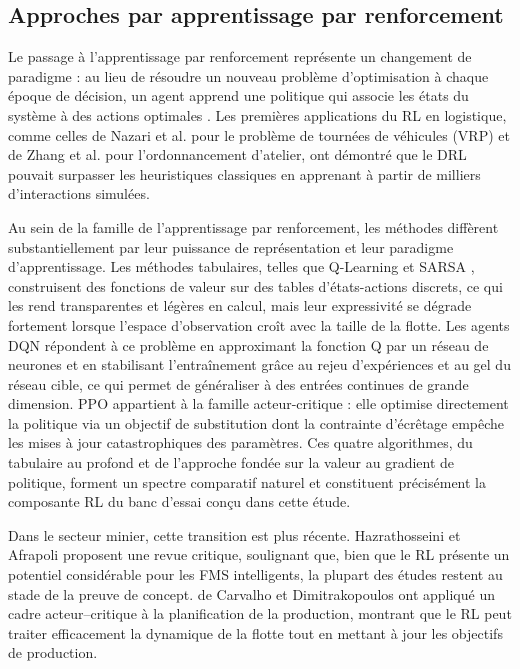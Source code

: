 \documentclass[11pt,a4paper]{article}
\newif\ifrevmarks
\newcommand{\revtag}[1]{\ifrevmarks\textsuperscript{\textcolor{red!70!black}{\scriptsize[#1]}}\fi}
\newcommand{\rev}[2]{\ifrevmarks{\color{revcolor}#2}\revtag{#1}\else#2\fi}
\begin{document}
\subsection{Approches par apprentissage par renforcement}

Le passage à l'apprentissage par renforcement représente un changement de paradigme : au lieu de résoudre un nouveau problème d'optimisation à chaque époque de décision, un agent apprend une politique qui associe les états du système à des actions optimales \cite{RichardSutton2018, MoezKrichen2022}. Les premières applications du RL en logistique, comme celles de Nazari et al. \cite{MohammadrezaNazari2018} pour le problème de tournées de véhicules (VRP) et de Zhang et al. \cite{CongZhang2020} pour l'ordonnancement d'atelier, ont démontré que le DRL pouvait surpasser les heuristiques classiques en apprenant à partir de milliers d'interactions simulées.

Au sein de la famille de l'apprentissage par renforcement, les méthodes diffèrent substantiellement par leur puissance de représentation et leur paradigme d'apprentissage. \rev{m5}{Les méthodes tabulaires, telles que Q-Learning et SARSA \cite{RichardSutton2018},} construisent des fonctions de valeur sur des tables d'états-actions discrets, ce qui les rend transparentes et légères en calcul, mais leur expressivité se dégrade fortement lorsque l'espace d'observation croît avec la taille de la flotte. Les agents DQN répondent à ce problème en approximant la fonction Q par un réseau de neurones et en stabilisant l'entraînement grâce au rejeu d'expériences et au gel du réseau cible, ce qui permet de généraliser à des entrées continues de grande dimension. PPO \cite{JohnSchulman2017} appartient à la famille acteur-critique : elle optimise directement la politique via un objectif de substitution dont la contrainte d'écrêtage empêche les mises à jour catastrophiques des paramètres. Ces quatre algorithmes, du tabulaire au profond et de l'approche fondée sur la valeur au gradient de politique, forment un spectre comparatif naturel et constituent précisément la composante RL du banc d'essai conçu dans cette étude.

Dans le secteur minier, cette transition est plus récente. Hazrathosseini et Afrapoli \cite{Hazrathosseini2024} proposent une revue critique, soulignant que, bien que le RL présente un potentiel considérable pour les FMS intelligents, la plupart des études restent au stade de la preuve de concept. de Carvalho et Dimitrakopoulos \cite{deCarvalho2023} ont appliqué un cadre acteur--critique à la planification de la production, montrant que le RL peut traiter efficacement la dynamique de la flotte tout en mettant à jour les objectifs de production.
\end{document}
